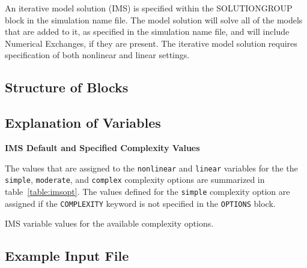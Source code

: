 An iterative model solution (IMS) is specified within the SOLUTIONGROUP block in the simulation name file.  The model solution will solve all of the models that are added to it, as specified in the simulation name file, and will include Numerical Exchanges, if they are present.  The iterative model solution requires specification of both nonlinear and linear settings.  

\vspace{5mm}
\subsection{Structure of Blocks}




\vspace{5mm}
\subsection{Explanation of Variables}
\begin{description}

\end{description}

\noindent \textbf{IMS Default and Specified Complexity Values}

The values that are assigned to the \texttt{nonlinear} and \texttt{linear} variables for the the \texttt{simple}, \texttt{moderate}, and \texttt{complex} complexity options are summarized in table~\ref{table:imsopt}. The values defined for the \texttt{simple} complexity option are assigned if the \texttt{COMPLEXITY} keyword is not specified in the \texttt{OPTIONS} block.

\begin{table}[H]
	\caption{IMS variable values for the available complexity options.}
	
	\label{table:imsopt}
\end{table}

\vspace{5mm}
\subsection{Example Input File}


